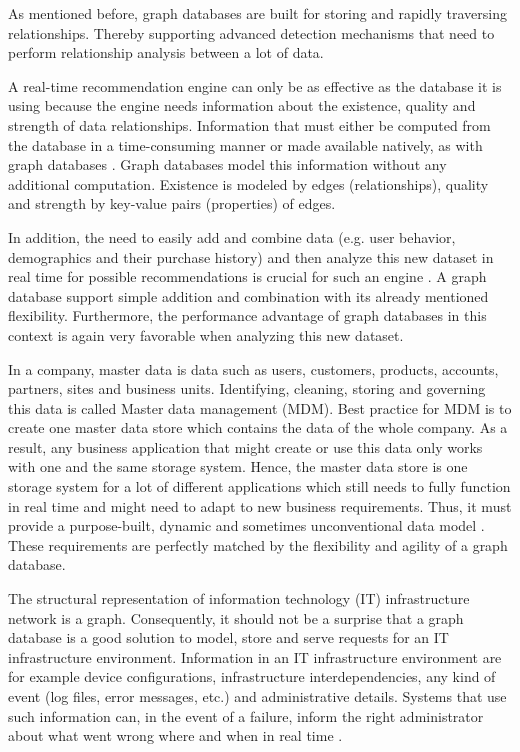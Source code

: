 As mentioned before, graph databases are built for storing and rapidly traversing relationships. Thereby supporting advanced detection mechanisms that need to perform relationship analysis between a lot of data.


A real-time recommendation engine can only be as effective as the database it is using because the engine needs information about the existence, quality and strength of data relationships. Information that must either be computed from the database in a time-consuming manner or made available natively, as with graph databases \autocite{neo4j:use_cases}. Graph databases model this information without any additional computation. Existence is modeled by edges (relationships), quality and strength by key-value pairs (properties) of edges.

In addition, the need to easily add and combine data (e.g. user behavior, demographics and their purchase history) and then analyze this new dataset in real time for possible recommendations is crucial for such an engine \autocite{neo4j:use_cases}. A graph database support simple addition and combination with its already mentioned flexibility. Furthermore, the performance advantage of graph databases in this context is again very favorable when analyzing this new dataset.


In a company, master data is data such as users, customers, products, accounts, partners, sites and business units. Identifying, cleaning, storing and governing this data is called Master data management (MDM). Best practice for MDM is to create one master data store which contains the data of the whole company. As a result, any business application that might create or use this data only works with one and the same storage system. Hence, the master data store is one storage system for a lot of different applications which still needs to fully function in real time and might need to adapt to new business requirements. Thus, it must provide a purpose-built, dynamic and sometimes unconventional data model \autocite{neo4j:use_cases}. These requirements are perfectly matched by the flexibility and agility of a graph database.


The structural representation of information technology (IT) infrastructure network is a graph. Consequently, it should not be a surprise that a graph database is a good solution to model, store and serve requests for an IT infrastructure environment. Information in an IT infrastructure environment are for example device configurations, infrastructure interdependencies, any kind of event (log files, error messages, etc.) and administrative details. Systems that use such information can, in the event of a failure, inform the right administrator about what went wrong where and when in real time \autocite{neo4j:use_cases}.


